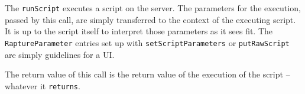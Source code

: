 The \verb+runScript+ executes a script on the \Rapture server. The parameters for the execution, passed
by this call, are simply transferred to the context of the executing script. It is up to the script itself to
interpret those parameters as it sees fit. The \verb+RaptureParameter+ entries set up with \verb+setScriptParameters+ or
\verb+putRawScript+ are simply guidelines for a UI.

The return value of this call is the return value of the execution of the script -- whatever it \verb+returns+.
